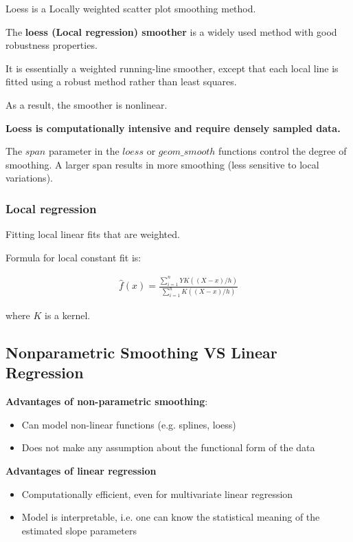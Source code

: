 \indent

Loess is a Locally weighted scatter plot smoothing method.

The \textbf{loess (Local regression) smoother} is a widely used method with good robustness properties.

It is essentially a weighted running-line smoother, except that each local line is fitted using a robust method rather than least squares.

As a result, the smoother is nonlinear.

\textbf{Loess is computationally intensive and require densely sampled data.}

The $span$ parameter in the $loess$ or $geom\_smooth$ functions control the degree of smoothing. A larger span results in more smoothing (less sensitive to local variations).

\subsubsection{Local regression}

\indent

Fitting local linear fits that are weighted.

Formula for local constant fit is:

\begin{align*}
    \hat{f}(x)=\frac{\sum_{i=1}^n YK((X-x)/h)}{\sum_{i=1}^n K((X-x)/h)}
\end{align*}

where $K$ is a kernel.

\subsection{Nonparametric Smoothing VS Linear Regression}

\noindent\textbf{Advantages of non-parametric smoothing}:

\begin{itemize}
    \item Can model non-linear functions (e.g. splines, loess)
    \item Does not make any assumption about the functional form of the data
\end{itemize}

\noindent\textbf{Advantages of linear regression}

\begin{itemize}
    \item Computationally efficient, even for multivariate linear regression
    \item Model is interpretable, i.e. one can know the statistical meaning of the estimated slope parameters
\end{itemize}
